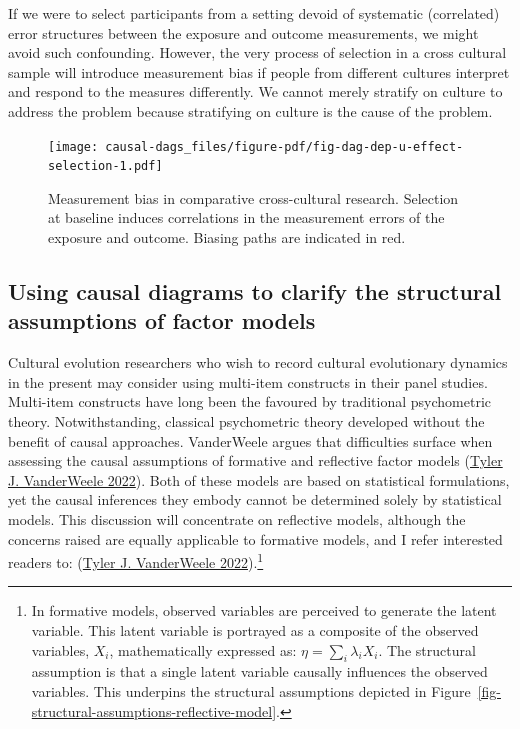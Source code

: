 \documentclass[
  singlecolumn]{report}
\begin{document}
If we were to select participants from a setting devoid of systematic
(correlated) error structures between the exposure and outcome
measurements, we might avoid such confounding. However, the very process
of selection in a cross cultural sample will introduce measurement bias
if people from different cultures interpret and respond to the measures
differently. We cannot merely stratify on culture to address the problem
because stratifying on culture is the cause of the problem.

\begin{figure}

{\centering \texttt{[image: causal-dags\_files/figure-pdf/fig-dag-dep-u-effect-selection-1.pdf]}

}

\caption{\label{fig-dag-dep-u-effect-selection}Measurement bias in
comparative cross-cultural research. Selection at baseline induces
correlations in the measurement errors of the exposure and outcome.
Biasing paths are indicated in red.}

\end{figure}

\hypertarget{using-causal-diagrams-to-clarify-the-structural-assumptions-of-factor-models}{%
\subsection{Using causal diagrams to clarify the structural assumptions
of factor
models}\label{using-causal-diagrams-to-clarify-the-structural-assumptions-of-factor-models}}

Cultural evolution researchers who wish to record cultural evolutionary
dynamics in the present may consider using multi-item constructs in
their panel studies. Multi-item constructs have long been the favoured
by traditional psychometric theory. Notwithstanding, classical
psychometric theory developed without the benefit of causal approaches.
VanderWeele argues that difficulties surface when assessing the causal
assumptions of formative and reflective factor models
(\protect\hyperlink{ref-vanderweele2022}{Tyler J. VanderWeele 2022}).
Both of these models are based on statistical formulations, yet the
causal inferences they embody cannot be determined solely by statistical
models. This discussion will concentrate on reflective models, although
the concerns raised are equally applicable to formative models, and I
refer interested readers to:
(\protect\hyperlink{ref-vanderweele2022}{Tyler J. VanderWeele
2022}).\footnote{In formative models, observed variables are perceived
  to generate the latent variable. This latent variable is portrayed as
  a composite of the observed variables, \(X_i\), mathematically
  expressed as: \(\eta = \sum_i\lambda_i X_i\). The structural
  assumption is that a single latent variable causally influences the
  observed variables. This underpins the structural assumptions depicted
  in Figure~\ref{fig-structural-assumptions-reflective-model}.}
\end{document}
